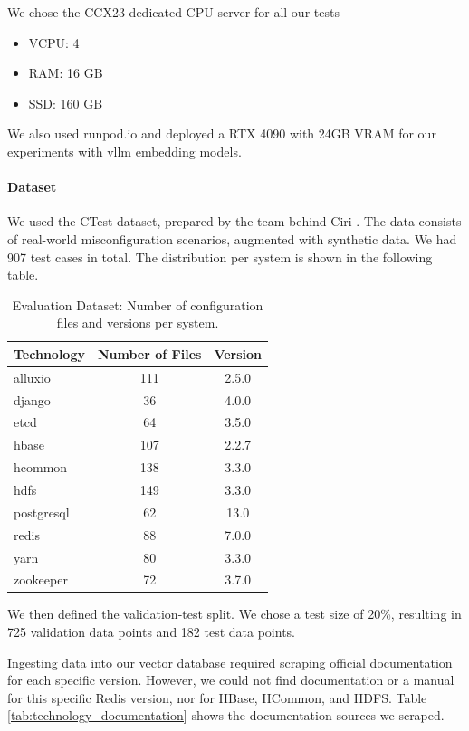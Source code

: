 We chose the CCX23 dedicated CPU server\cite{hetzner-online-gmbh-2025} for all our tests
\begin{itemize}
    \item VCPU: 4
    \item RAM: 16 GB
    \item SSD: 160 GB
\end{itemize}

We also used runpod.io\cite{runpod-2025} and deployed a RTX 4090 with 24GB VRAM for our experiments with vllm \cite{Kwon.12.09.2023} embedding models.

\paragraph{Dataset} 
We used the CTest dataset, prepared by the team behind Ciri \cite{Lian.2024}\cite{xlab-uiuc-2025}. The data consists of real-world misconfiguration scenarios, augmented with synthetic data. We had 907 test cases in total. The distribution per system is shown in the following table.

\begin{table}[h]
    \centering
    \begin{tabular}{|l|c|c|}
        \hline
        \textbf{Technology} & \textbf{Number of Files} & \textbf{Version} \\
        \hline
        alluxio & 111 & 2.5.0 \\
        django & 36 & 4.0.0 \\
        etcd & 64 & 3.5.0 \\
        hbase & 107 & 2.2.7 \\
        hcommon & 138 & 3.3.0 \\
        hdfs & 149 & 3.3.0 \\
        postgresql & 62 & 13.0 \\
        redis & 88 & 7.0.0 \\
        yarn & 80 & 3.3.0 \\
        zookeeper & 72 & 3.7.0 \\
        \hline
    \end{tabular}
    \caption{Evaluation Dataset: Number of configuration files and versions per system.}
    \label{tab:technology_values}
\end{table}

We then defined the validation-test split. We chose a test size of 20\%, resulting in 725 validation data points and 182 test data points.  

Ingesting data into our vector database required scraping official documentation for each specific version. However, we could not find documentation or a manual for this specific Redis version, nor for HBase, HCommon, and HDFS. Table \ref{tab:technology_documentation} shows the documentation sources we scraped.

